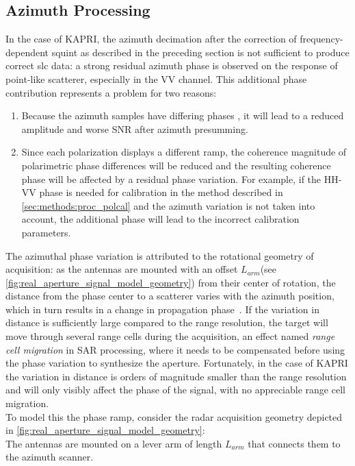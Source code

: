 \subsection{Azimuth Processing}\label{sec:methods:azimuth_processing}
In the case of KAPRI, the azimuth decimation after the correction of frequency-dependent squint as described in the preceding section is not sufficient to produce correct slc data: a strong residual  azimuth phase is observed on the response of point-like scatterer, especially in the VV channel. This additional phase contribution represents a problem for two reasons:
\begin{enumerate}
	\item Because the azimuth samples have differing phases
	, it will lead to a reduced amplitude and worse SNR after azimuth presumming. 
  \item Since each polarization displays a different ramp, the coherence magnitude of polarimetric phase differences will be reduced and the resulting coherence phase will be affected by a residual phase variation. For example, if the HH-VV phase is needed for calibration in the method described in \autoref{sec:methods:proc_polcal} and the azimuth variation is not taken into account, the additional phase will lead to the incorrect calibration parameters.\label{item:phase_variation}
\end{enumerate}
The azimuthal phase variation is attributed to the rotational geometry of acquisition: as the antennas are mounted with an  offset $L_{arm}$(see \autoref{fig:real_aperture_signal_model_geometry}) from their center of rotation, the distance from the phase center to a scatterer varies with the azimuth position, which in turn results in a change in propagation phase~\cite{Lee2014}. If the variation in distance is sufficiently large compared to the range resolution, the target will move through several range cells during the acquisition, an effect named \emph{range cell migration} in SAR processing, where it needs to be compensated before using the phase variation to synthesize the aperture. Fortunately, in the case of KAPRI the variation in distance is orders of magnitude smaller than the range resolution and will only visibly affect the phase of the signal, with no appreciable range cell migration.\\
To model this the phase ramp, consider the radar acquisition geometry depicted in \autoref{fig:real_aperture_signal_model_geometry}:\\
The antennas are mounted on a lever arm of length $L_{arm}$ that connects them to the azimuth scanner.
